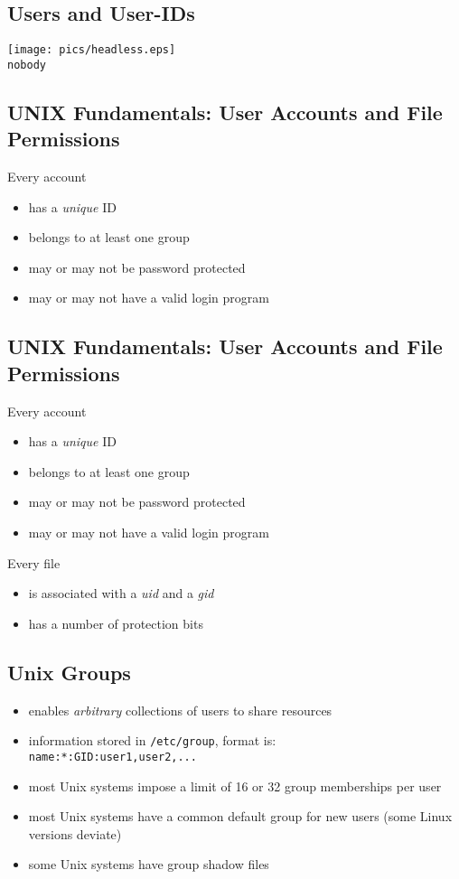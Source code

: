 \documentclass[xga]{xdvislides}
\begin{document}
\subsection{Users and User-IDs}

\begin{center}
	\texttt{[image: pics/headless.eps]} \\
	{\tt nobody}
\end{center}


\subsection{UNIX Fundamentals: User Accounts and File Permissions}
Every account
\begin{itemize}
	\item has a {\em unique} ID
	\item belongs to at least one group
	\item may or may not be password protected
	\item may or may not have a valid login program
\end{itemize}

\subsection{UNIX Fundamentals: User Accounts and File Permissions}
Every account
\begin{itemize}
	\item has a {\em unique} ID
	\item belongs to at least one group
	\item may or may not be password protected
	\item may or may not have a valid login program
\end{itemize}
\addvspace{.5in}
Every file
\begin{itemize}
	\item is associated with a {\em uid} and a {\em gid}
	\item has a number of protection bits
\end{itemize}


\subsection{Unix Groups}
\begin{itemize}
	\item enables {\em arbitrary} collections of users to share resources
	\item information stored in \verb+/etc/group+, format is: \\
		\verb+name:*:GID:user1,user2,...+
	\item most Unix systems impose a limit of 16 or 32 group memberships per
		user
	\item most Unix systems have a common default group for new users (some
		Linux versions deviate)
	\item some Unix systems have group shadow files
\end{itemize}
\end{document}
